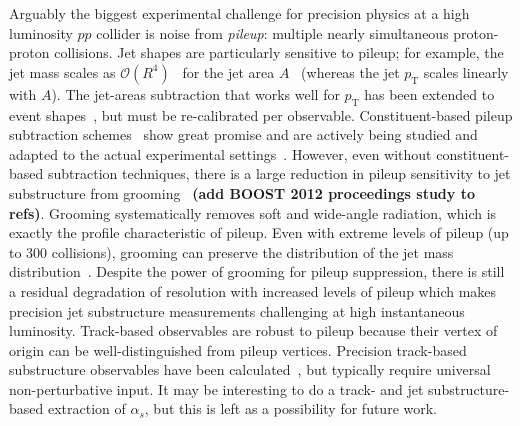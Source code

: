 Arguably the biggest experimental challenge for precision physics at a high luminosity $pp$ collider is noise from \textit{pileup}: multiple nearly simultaneous proton-proton collisions.  Jet shapes are particularly sensitive to pileup; for example, the jet mass scales as $\mathcal{O}(R^4)$~\cite{Salam:2009jx} for the jet area $A$~\cite{Cacciari:2008gn} (whereas the jet $p_\text{T}$ scales linearly with $A$).  The jet-areas subtraction that works well for $p_\text{T}$ has been extended to event shapes~\cite{Soyez:2012hv}, but must be re-calibrated per observable.  Constituent-based pileup subtraction schemes~\cite{Cacciari:2014gra,Krohn:2013lba,Bertolini:2014bba,Berta:2014eza,Komiske:2017ubm} show great promise and are actively being studied and adapted to the actual experimental settings~\cite{CMS-PAS-JME-14-001,CMS-DP-2015-034,ATLAS-CONF-2017-065,ATL-PHYS-PUB-2017-020,Aad:2015ina}.  However, even without constituent-based subtraction techniques, there is a large reduction in pileup sensitivity to jet substructure from grooming~\cite{CMS-PAS-JME-14-001,Aad:2015rpa,Aad:2015ina} \textbf{(add BOOST 2012 proceedings study to refs)}.  Grooming systematically removes soft and wide-angle radiation, which is exactly the profile characteristic of pileup.   Even with extreme levels of pileup (up to 300 collisions), grooming can preserve the distribution of the jet mass distribution~\cite{JetSubstructureECFA2014}.   Despite the power of grooming for pileup suppression, there is still a residual degradation of resolution with increased levels of pileup which makes precision jet substructure measurements challenging at high instantaneous luminosity.  Track-based observables are robust to pileup because their vertex of origin can be well-distinguished from pileup vertices.  Precision track-based substructure observables have been calculated~\cite{Krohn:2012fg,Waalewijn:2012sv,Chang:2013rca,Elder:2017bkd}, but typically require universal non-perturbative input.  It may be interesting to do a track- and jet substructure-based extraction of $\alpha_s$, but this is left as a possibility for future work.
